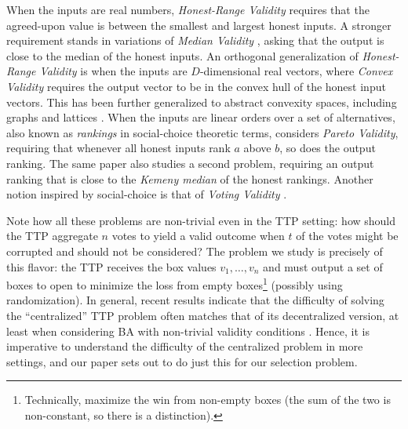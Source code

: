 \documentclass[sigconf,nonacm]{aamas}
\begin{document}
When the inputs are real numbers, \emph{Honest-Range Validity} \cite{aa_with_range_validity} requires that the agreed-upon value is between the smallest and largest honest inputs. A stronger requirement stands in variations of \emph{Median Validity} \cite{stolz,clocks,kth_element}, asking that the output is close to the median of the honest inputs. An orthogonal generalization of \emph{Honest-Range Validity} is when the inputs are $D$-dimensional real vectors, where \emph{Convex Validity} \cite{vaidya_garg_convex,convex_aa} requires the output vector to be in the convex hull of the honest input vectors. This has been further generalized to abstract convexity spaces, including graphs and lattices \cite{generalized_convexity_space_us,nowak_rybicki}. When the inputs are linear orders over a set of alternatives, also known as \emph{rankings} in social-choice theoretic terms, \cite{darya-byzantine-voting} considers \emph{Pareto Validity}, requiring that whenever all honest inputs rank $a$ above $b$, so does the output ranking. The same paper also studies a second problem, requiring an output ranking that is close to the \emph{Kemeny median} of the honest rankings. Another notion inspired by social-choice is that of \emph{Voting Validity} \cite{voting-validity}.

Note how all these problems are non-trivial even in the TTP setting: how should the TTP aggregate $n$ votes to yield a valid outcome when $t$ of the votes might be corrupted and should not be considered? The problem we study is precisely of this flavor: the TTP receives the box values $v_1, \dots, v_n$ and must output a set of boxes to open to minimize the loss from empty boxes\footnote{Technically, maximize the win from non-empty boxes (the sum of the two is non-constant, so there is a distinction).} (possibly using randomization). In general, recent results indicate that the difficulty of solving the ``centralized'' TTP problem often matches that of its decentralized version, at least when considering BA with non-trivial validity conditions \cite{pierre_civit_1,pierre_civit_2,constantinescu2024validitynetworkagnosticbyzantineagreement}. Hence, it is imperative to understand the difficulty of the centralized problem in more settings, and our paper sets out to do just this for our selection problem.
\end{document}
